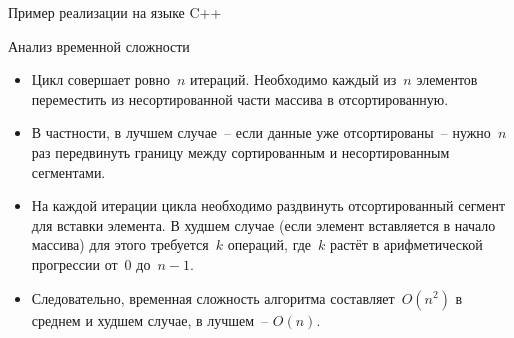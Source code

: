 \documentclass[landscape]{slides}
\begin{document}
\begin{slide}
  Пример реализации на языке C++

  
\end{slide}

\begin{slide}
  Анализ временной сложности
  \begin{itemize}
      \item Цикл совершает ровно~$n$ итераций. Необходимо каждый из~$n$ элементов переместить из несортированной части
        массива в отсортированную.
      \item В частности, в лучшем случае~-- если данные уже отсортированы~-- нужно~$n$ раз передвинуть границу между
        сортированным и несортированным сегментами.
      \item На каждой итерации цикла необходимо раздвинуть отсортированный сегмент для вставки элемента. В худшем случае
        (если элемент вставляется в начало массива) для этого требуется~$k$ операций, где~$k$ растёт в арифметической
        прогрессии от~$0$ до~$n-1$.
      \item Следовательно, временная сложность алгоритма составляет~$O(n^2)$ в среднем и худшем случае, в лучшем~-- $O(n)$.
  \end{itemize}
\end{slide}
\end{document}

